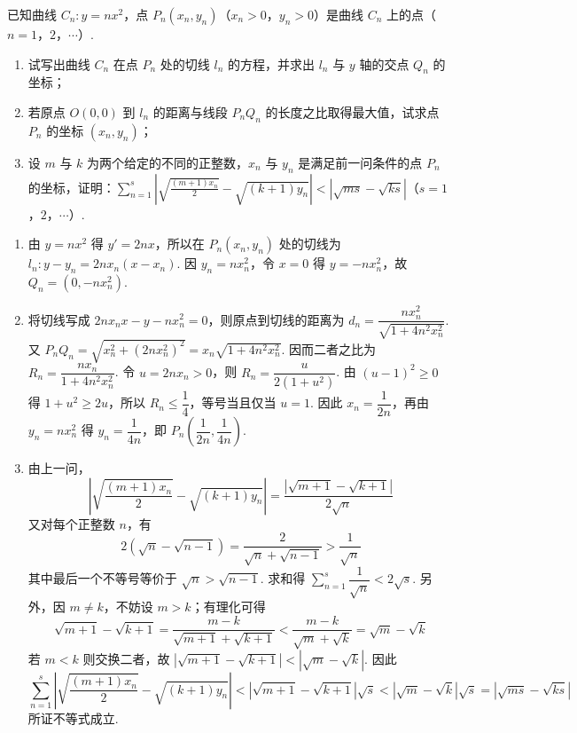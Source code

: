\begin{problem}
已知曲线 \(C_n: y = nx^2\)，点 \(P_n(x_n, y_n)\)（\(x_n > 0\)，\(y_n > 0\)）是曲线 \(C_n\) 上的点（\(n = 1\)，\(2\)，\(\cdots\)）.

\begin{enumerate}
\item 试写出曲线 \(C_n\) 在点 \(P_n\) 处的切线 \(l_n\) 的方程，并求出 \(l_n\) 与 \(y\) 轴的交点 \(Q_n\) 的坐标；
\item 若原点 \(O(0, 0)\) 到 \(l_n\) 的距离与线段 \(P_nQ_n\) 的长度之比取得最大值，试求点 \(P_n\) 的坐标 \((x_n, y_n)\)；
\item 设 \(m\) 与 \(k\) 为两个给定的不同的正整数，\(x_n\) 与 \(y_n\) 是满足前一问条件的点 \(P_n\) 的坐标，证明：\(\sum_{n=1}^{s} \left| \sqrt{\frac{(m + 1)x_n}{2}} - \sqrt{(k + 1)y_n} \right| < \left| \sqrt{ms} - \sqrt{ks} \right|\)（\(s = 1\)，\(2\)，\(\cdots\)）.
\end{enumerate}
\end{problem}

\begin{solution}
\begin{enumerate}
\item 由 \(y=nx^2\) 得 \(y'=2nx\)，所以在 \(P_n(x_n,y_n)\) 处的切线为
\(l_n:y-y_n=2nx_n(x-x_n)\). 因 \(y_n=nx_n^2\)，令 \(x=0\) 得 \(y=-nx_n^2\)，故 \(Q_n=(0,-nx_n^2)\).
\item 将切线写成 \(2nx_nx-y-nx_n^2=0\)，则原点到切线的距离为
\(d_n=\dfrac{nx_n^2}{\sqrt{1+4n^2x_n^2}}\). 又
\(P_nQ_n=\sqrt{x_n^2+(2nx_n^2)^2}=x_n\sqrt{1+4n^2x_n^2}\). 因而二者之比为
\(R_n=\dfrac{nx_n}{1+4n^2x_n^2}\). 令 \(u=2nx_n>0\)，则 \(R_n=\dfrac{u}{2(1+u^2)}\). 由 \((u-1)^2\ge0\) 得 \(1+u^2\ge2u\)，所以 \(R_n\le\dfrac14\)，等号当且仅当 \(u=1\). 因此 \(x_n=\dfrac1{2n}\)，再由 \(y_n=nx_n^2\) 得 \(y_n=\dfrac1{4n}\)，即 \(P_n\left(\dfrac1{2n},\dfrac1{4n}\right)\).
\item 由上一问，
\[
\left|\sqrt{\frac{(m+1)x_n}{2}}-\sqrt{(k+1)y_n}\right|=\frac{|\sqrt{m+1}-\sqrt{k+1}|}{2\sqrt n}
\]
又对每个正整数 \(n\)，有
\[
2(\sqrt n-\sqrt{n-1})=\frac{2}{\sqrt n+\sqrt{n-1}}>\frac1{\sqrt n}
\]
其中最后一个不等号等价于 \(\sqrt n>\sqrt{n-1}\). 求和得
\(\sum_{n=1}^s\dfrac1{\sqrt n}<2\sqrt s\). 另外，因 \(m\ne k\)，不妨设 \(m>k\)；有理化可得
\[
\sqrt{m+1}-\sqrt{k+1}=\frac{m-k}{\sqrt{m+1}+\sqrt{k+1}}<\frac{m-k}{\sqrt m+\sqrt k}=\sqrt m-\sqrt k
\]
若 \(m<k\) 则交换二者，故
\(|\sqrt{m+1}-\sqrt{k+1}|<|\sqrt m-\sqrt k|\). 因此
\[
\sum_{n=1}^{s}\left|\sqrt{\frac{(m+1)x_n}{2}}-\sqrt{(k+1)y_n}\right|
<|\sqrt{m+1}-\sqrt{k+1}|\sqrt s
<|\sqrt m-\sqrt k|\sqrt s
=|\sqrt{ms}-\sqrt{ks}|
\]
所证不等式成立.
\end{enumerate}
\end{solution}
